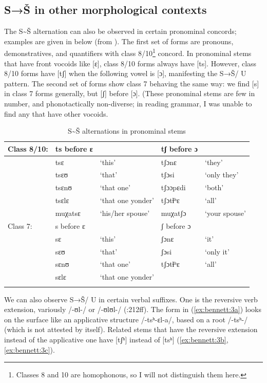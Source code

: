 \documentclass[output=paper,newtxmath,modfonts,nonflat,hidelinks]{langsci/langscibook}
\begin{document}
\subsection{S→Š in other morphological contexts}\label{sec:bennett:2.4}
\largerpage
The S{\textasciitilde}Š alternation can also be observed in certain pronominal concords; examples are given in  below (from \citealt{Cole1955}). The first set of forms are pronouns, demonstratives, and quantifiers with class 8/10\footnote{Classes 8 and 10 are homophonous, so I will not distinguish them here.} concord. In pronominal stems that have front vocoids like [ɛ], class 8/10 forms always have [ts]. However, class 8/10 forms have [tʃ] when the following vowel is [ɔ], manifesting the S→Š/ {\longrule} U pattern. The second set of forms show class 7 behaving the same \break  way: we find [s] in class 7 forms generally, but [ʃ] before [ɔ]. (These pronominal stems are few in number, and phonotactically non-diverse; in reading  grammar, I was unable to find any that have other vocoids.


\begin{table}
\begin{tabularx}{\textwidth}{llQll}
\lsptoprule
Class 8/10: & ts before ɛ &  & tʃ before ɔ & \\
\midrule
& tsɛ & ‘this’ & tʃɔnɛ & ‘they’\\
& tsɛʊ & ‘that’ & tʃɔsi & ‘only they’\\
& tsɛnʊ & ‘that one’ & tʃɔɔpɛdi & ‘both’\\
& tsɛlɛ & ‘that one yonder’ & tʃɔtɬʰɛ & ‘all’\\
& muχatsɛ & ‘his/her spouse’ & muχatʃɔ & ‘your spouse’\\
\midrule
Class 7: & s before ɛ &  & ʃ before ɔ & \\
\midrule
& sɛ & ‘this’ & ʃɔnɛ & ‘it’\\
& sɛʊ & ‘that’ & ʃɔsi & ‘only it’\\
& sɛnʊ & ‘that one’ & tʃɔtɬʰɛ & ‘all’\\
& sɛlɛ & ‘that one yonder’ &  & \\
\lspbottomrule
\end{tabularx}
\caption{S{\textasciitilde}Š alternations in pronominal stems\label{tab:bennett:3}}
\end{table}


We can also observe S→Š/ {\longrule} U in certain verbal suffixes. One is the reversive verb extension, variously /-ʊl-/ or /-ʊlʊl-/  (\citealt{Cole1955}:212ff). The form in (\ref{ex:bennett:3a}) looks on the surface like an applicative structure /-tsʰ-ɛl-a/, based on a root /-tsʰ-/ (which is not attested by itself). Related stems that have the reversive extension instead of the applicative one have [tʃʰ] instead of [tsʰ] (\ref{ex:bennett:3b},\ref{ex:bennett:3c}).
\end{document}

